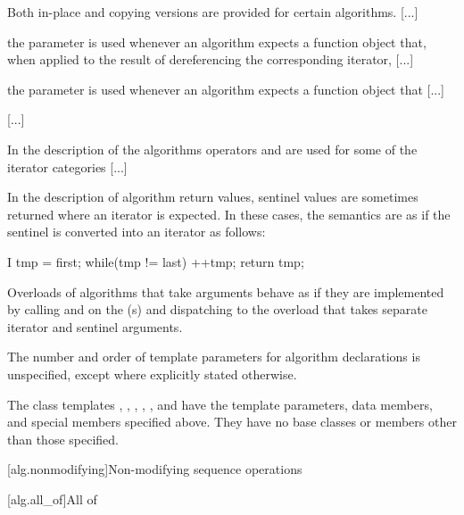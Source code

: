 \pnum
Both in-place and copying versions are provided for certain
algorithms. [...]

\pnum
{} the
parameter is used whenever an algorithm expects a function object
that, when applied to the result
of dereferencing the corresponding iterator, [...]

\pnum
{} the
parameter is used whenever an algorithm expects a function object that [...]

[...]

\setcounter{Paras}{10}
\pnum
In the description of the algorithms operators
\tcode{+}
and
\tcode{-}
are used for some of the iterator categories [...]

\begin{addedblock}
\pnum
In the description of algorithm return values, sentinel values are sometimes
returned where an iterator is expected. In these cases, the semantics are as
if the sentinel is converted into an iterator as follows:

\begin{codeblock}
I tmp = first;
while(tmp != last)
  ++tmp;
return tmp;
\end{codeblock}

\pnum
Overloads of algorithms that take  arguments
behave as if they are implemented by calling  and
 on the (s) and dispatching
to the overload that takes separate iterator and sentinel arguments.

\pnum
The number and order of template parameters for algorithm declarations
is unspecified, except where explicitly stated otherwise.

{\color{newclr}
\pnum
The class templates  , ,
, , , and
 have the template parameters, data members, and
special members specified above. They have no base classes or members other than
those specified.
} %
\end{addedblock}

\setcounter{section}{4}
[alg.nonmodifying]{Non-modifying sequence operations}

[alg.all_of]{All of}

